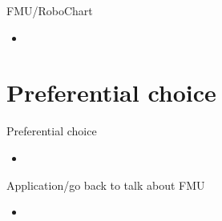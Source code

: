 \documentclass[%
slidestop,%
compress,%
mathserif,%
table,%
usenames,%
aspectratio=169,
dvipsnames,%
]{beamer}%
\begin{document}
\begin{frame}{FMU/RoboChart}
    \begin{itemize}
        \item 
    \end{itemize}
\end{frame}

\section{Preferential choice}
\begin{frame}{Preferential choice}
    \begin{itemize}
        \item 
    \end{itemize}
\end{frame}

\begin{frame}{Application/go back to talk about FMU}
    \begin{itemize}
        \item 
    \end{itemize}
\end{frame}
\end{document}
